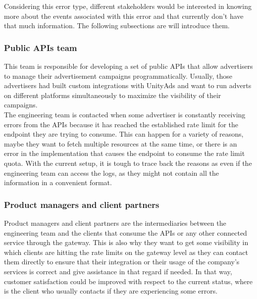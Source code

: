 \documentclass[english, 12pt, a4paper, sci, utf8, a-1b, online]{aaltothesis}
\begin{document}
Considering this error type, different stakeholders would be interested in knowing more about the events associated with this error and that currently don't have that much information. The following subsections are will introduce them.

\subsubsection*{Public APIs team}

This team is responsible for developing a set of public APIs that allow advertisers to manage their advertisement campaigns programmatically. Usually, those advertisers had built custom integrations with UnityAds and want to run adverts on different platforms simultaneously to maximize the visibility of their campaigns.\\

The engineering team is contacted when some advertiser is constantly receiving errors from the APIs because it has reached the established rate limit for the endpoint they are trying to consume. This can happen for a variety of reasons, maybe they want to fetch multiple resources at the same time, or there is an error in the implementation that causes the endpoint to consume the rate limit quota. With the current setup, it is tough to trace back the reasons as even if the engineering team can access the logs, as they might not contain all the information in a convenient format.


\subsubsection*{Product managers and client partners}

Product managers and client partners are the intermediaries between the engineering team and the clients that consume the APIs or any other connected service through the gateway. This is also why they want to get some visibility in which clients are hitting the rate limits on the gateway level as they can contact them directly to ensure that their integration or their usage of the company's services is correct and give assistance in that regard if needed. In that way, customer satisfaction could be improved with respect to the current status, where is the client who usually contacts if they are experiencing some errors.\\
\end{document}
